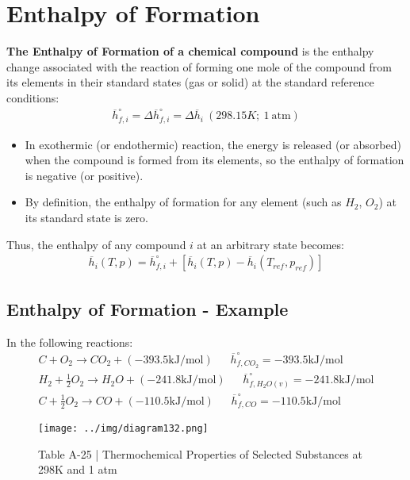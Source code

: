\documentclass[class=report, crop=false, 12pt,a4paper]{standalone}
\numberwithin{equation}{section}
\begin{document}
\section{Enthalpy of Formation}
\textbf{The Enthalpy of Formation of a chemical compound} is the enthalpy change associated with the reaction of forming one mole of the compound from its elements in their standard states (gas or solid) at the standard reference conditions:
\begin{gather}
  \overline{h}_{f,i}^\circ = \Delta \overline{h}_{f,i}^\circ = \Delta \overline{h}_i \ (298.15K;\ 1\ \text{atm})
\end{gather}
\begin{itemize}[noitemsep]
  \item In exothermic (or endothermic) reaction, the energy is released (or absorbed) when the compound is formed from its elements, so the enthalpy of formation is negative (or positive).
  \item By definition, the enthalpy of formation for any element (such as $H_2$, $O_2$) at its standard state is zero.
\end{itemize}
Thus, the enthalpy of any compound $i$ at an arbitrary state becomes:
\begin{gather}
  \overline{h}_{i}(T,p) = \overline{h}_{f,i}^\circ + \left[\overline{h}_{i}(T,p) - \overline{h}_{i}(T_{ref},p_{ref})\right]
\end{gather}
\subsection{Enthalpy of Formation - Example}
In the following reactions:
\begin{gather}
  C + O_2 \longrightarrow CO_2 + (-393.5 \si{\kilo\joule\per\mole}) \ \ \ \ \ \ \ \overline{h}_{f,CO_2}^\circ = -393.5 \si{\kilo\joule\per\mole} \\[5pt]
  H_2 + \frac{1}{2}O_2 \longrightarrow H_2O + (-241.8 \si{\kilo\joule\per\mole}) \ \ \ \ \ \ \ \overline{h}_{f,H_2O(v)}^\circ = -241.8 \si{\kilo\joule\per\mole} \\[5pt]
  C + \frac{1}{2}O_2 \longrightarrow CO + (-110.5 \si{\kilo\joule\per\mole}) \ \ \ \ \ \ \ \overline{h}_{f,CO}^\circ = -110.5 \si{\kilo\joule\per\mole} 
\end{gather}
\begin{figure}[H]
  \centering
  \texttt{[image: ../img/diagram132.png]}
  \caption{Table A-25 | Thermochemical Properties of Selected Substances at 298K and 1 atm}
\end{figure}
\end{document}
